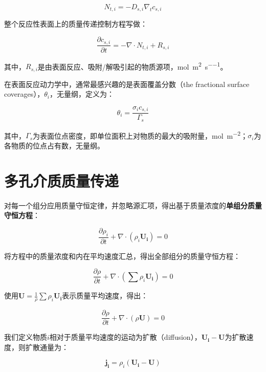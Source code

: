 \begin{equation}
N_{t,i} = -D_{s,i}\nabla_t c_{s,i}
\end{equation}

整个反应性表面上的质量传递控制方程写做：

\begin{equation}\label{key}
\frac{\partial c_{s,i}}{\partial t} = -\nabla\cdot N_{t,i} + R_{s,i}
\end{equation}

其中，$ R_{s,i} $是由表面反应、吸附/解吸引起的物质源项，\si{\mole\per\meter\squared\per\second}。

在表面反应动力学中，通常最感兴趣的是表面覆盖分数（the fractional surface coverages），$ \theta_i $，无量纲，定义为：

\begin{equation}
\theta_i = \frac{\sigma_i c_{s,i}}{\Gamma_s}
\end{equation}

其中，$ \Gamma_s $为表面位点密度，即单位面积上对物质的最大的吸附量，\si{\mole\per\meter\squared}；$ \sigma_i $为各物质的位点占有数，无量纲。

\section{多孔介质质量传递}

对每一个组分应用质量守恒定律，并忽略源汇项，得出基于质量浓度的\textbf{单组分质量守恒方程}：

\begin{equation}
\frac{\partial \rho_i}{\partial t} + \nabla\cdot(\rho_i\bm{U_i}) = 0
\end{equation}

将方程中的质量浓度和内在平均速度汇总，得出全部组分的质量守恒方程：

\begin{equation}
\frac{\partial \rho}{\partial t} + \nabla\cdot(\sum\rho_i\bm{U_i}) = 0
\end{equation}

使用$ \bm{U}=\frac{1}{\rho}\sum\rho_i\bm{U_i} $表示质量平均速度，得出：

\begin{equation}
\frac{\partial \rho}{\partial t} + \nabla\cdot(\rho\bm{U}) = 0
\end{equation}

我们定义物质$ i $相对于质量平均速度的运动为扩散（diffusion），$ \bm{U_i}-\bm{U} $为扩散速度，则扩散通量为：

\begin{equation}
\bm{j_i} = \rho_i(\bm{U_i} - \bm{U})
\end{equation}

